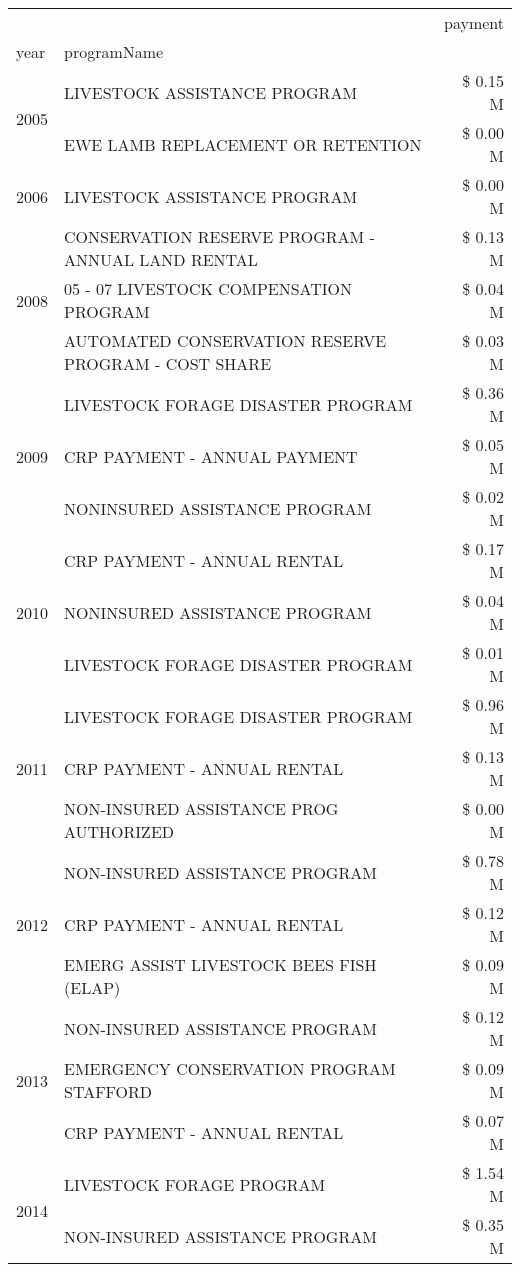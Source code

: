 \begin{tabular}{llr}
\toprule
 &  & payment \\
year & programName &  \\
\midrule
\multirow[t]{2}{*}{2005} & LIVESTOCK ASSISTANCE PROGRAM & \$ 0.15 M \\
 & EWE LAMB REPLACEMENT OR RETENTION & \$ 0.00 M \\
\cline{1-3}
2006 & LIVESTOCK ASSISTANCE PROGRAM & \$ 0.00 M \\
\cline{1-3}
\multirow[t]{3}{*}{2008} & CONSERVATION RESERVE PROGRAM - ANNUAL LAND RENTAL & \$ 0.13 M \\
 & 05 - 07 LIVESTOCK COMPENSATION PROGRAM & \$ 0.04 M \\
 & AUTOMATED CONSERVATION RESERVE PROGRAM - COST SHARE & \$ 0.03 M \\
\cline{1-3}
\multirow[t]{3}{*}{2009} & LIVESTOCK FORAGE DISASTER  PROGRAM & \$ 0.36 M \\
 & CRP PAYMENT - ANNUAL PAYMENT & \$ 0.05 M \\
 & NONINSURED ASSISTANCE PROGRAM & \$ 0.02 M \\
\cline{1-3}
\multirow[t]{3}{*}{2010} & CRP PAYMENT - ANNUAL RENTAL & \$ 0.17 M \\
 & NONINSURED ASSISTANCE PROGRAM & \$ 0.04 M \\
 & LIVESTOCK FORAGE DISASTER PROGRAM & \$ 0.01 M \\
\cline{1-3}
\multirow[t]{3}{*}{2011} & LIVESTOCK FORAGE DISASTER PROGRAM & \$ 0.96 M \\
 & CRP PAYMENT - ANNUAL RENTAL & \$ 0.13 M \\
 & NON-INSURED ASSISTANCE PROG AUTHORIZED & \$ 0.00 M \\
\cline{1-3}
\multirow[t]{3}{*}{2012} & NON-INSURED ASSISTANCE PROGRAM & \$ 0.78 M \\
 & CRP PAYMENT - ANNUAL RENTAL & \$ 0.12 M \\
 & EMERG ASSIST LIVESTOCK BEES FISH (ELAP) & \$ 0.09 M \\
\cline{1-3}
\multirow[t]{3}{*}{2013} & NON-INSURED ASSISTANCE PROGRAM & \$ 0.12 M \\
 & EMERGENCY CONSERVATION PROGRAM STAFFORD & \$ 0.09 M \\
 & CRP PAYMENT - ANNUAL RENTAL & \$ 0.07 M \\
\cline{1-3}
\multirow[t]{3}{*}{2014} & LIVESTOCK FORAGE PROGRAM & \$ 1.54 M \\
 & NON-INSURED ASSISTANCE PROGRAM & \$ 0.35 M \\

\end{tabular}
